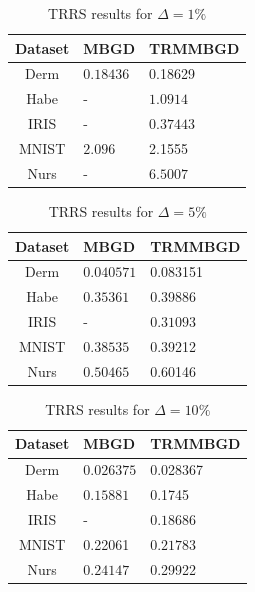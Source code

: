 \documentclass[letterpaper,12pt,titlepage,oneside,final]{book}
\begin{document}
	\begin{table}[h] 
		\centering 
		\begin{tabular}{ |c|l|l| } 
			\hline 
			\textbf{Dataset} & \textbf{MBGD} & \textbf{TRMMBGD}\\ 
			\hline 
			Derm & $\mathbf{0.18436}$ &0.18629\\ 
			\hline 
			Habe & - & $\mathbf{1.0914}$\\ 
			\hline 
			IRIS & - & $\mathbf{0.37443}$\\ 
			\hline 
			MNIST & $\mathbf{2.096}$ &2.1555\\ 
			\hline 
			Nurs & - & $\mathbf{6.5007}$\\ 
			\hline 
		\end{tabular} 
		\caption{TRRS results for $\Delta = 1\%$} \label{TRMMBGD1} \end{table}
	
	\begin{table}[h] 
		\centering 
		\begin{tabular}{ |c|l|l| } 
			\hline 
			\textbf{Dataset} & \textbf{MBGD} &  \textbf{TRMMBGD}\\ 
			\hline 
			Derm & $\mathbf{0.040571}$ &0.083151\\ 
			\hline 
			Habe & $\mathbf{0.35361}$ &0.39886\\ 
			\hline 
			IRIS & - & $\mathbf{0.31093}$\\ 
			\hline 
			MNIST & $\mathbf{0.38535}$ &0.39212\\ 
			\hline 
			Nurs & $\mathbf{0.50465}$ &0.60146\\ 
			\hline 
		\end{tabular} 
		\caption{TRRS results for $\Delta = 5\%$} \label{TRMMBGD5} \end{table}
	
	\begin{table}[h] 
		\centering 
		\begin{tabular}{ |c|l|l| } 
			\hline 
			\textbf{Dataset} & \textbf{MBGD} & \textbf{TRMMBGD}\\ 
			\hline 
			Derm & $\mathbf{0.026375}$ &0.028367\\ 
			\hline 
			Habe & $\mathbf{0.15881}$ &0.1745\\ 
			\hline 
			IRIS & - & $\mathbf{0.18686}$\\ 
			\hline 
			MNIST &0.22061 & $\mathbf{0.21783}$\\ 
			\hline 
			Nurs & $\mathbf{0.24147}$ &0.29922\\ 
			\hline 
		\end{tabular} 
		\caption{TRRS results for $\Delta = 10\%$} \label{TRMMBGD10} \end{table}
	
\end{document}
